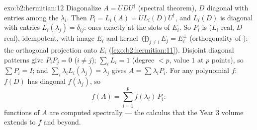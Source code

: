 \begin{solution}{exo:b2:hermitian:12}
Diagonalize $A = U D U^\dagger$ (spectral theorem), $D$ diagonal
with entries among the $\lambda_i$. Then $P_i = L_i(A) = U
L_i(D)U^\dagger$, and $L_i(D)$ is diagonal with entries
$L_i(\lambda_j) = \delta_{ij}$: ones exactly at the slots of
$E_i$. So $P_i$ is  ($L_i$ real, $D$ real), idempotent,
with image $E_i$ and kernel $\bigoplus_{j\neq i}E_j = E_i^\perp$
(orthogonality of ): the orthogonal projection onto
$E_i$ (\cref{exo:b2:hermitian:11}). Disjoint diagonal patterns
give $P_iP_j = 0$ ($i \neq j$); $\sum_i L_i = 1$ (degree $< p$,
value $1$ at $p$ points), so $\sum P_i = I$; and $\sum_i
\lambda_iL_i(\lambda_j) = \lambda_j$ gives $A = \sum
\lambda_iP_i$. For any polynomial $f$: $f(D)$ has diagonal
$f(\lambda_j)$, so
\[
f(A) = \sum_{i=1}^{p} f(\lambda_i)\,P_i :
\]
functions of $A$ are computed spectrally --- the calculus that
the Year 3 volume extends to  $f$ and beyond.
\end{solution}

